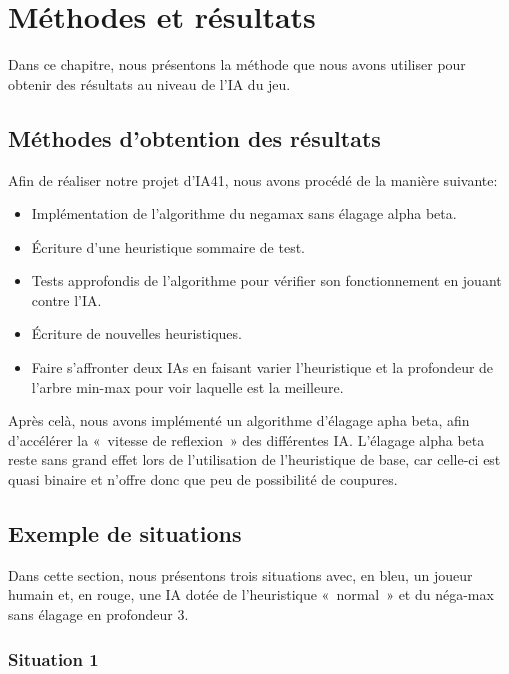 \chapter{Méthodes et résultats}\label{chapter:methodes-resultats}

Dans ce chapitre, nous présentons la méthode que nous avons utiliser pour obtenir des résultats au niveau de l'IA du jeu.

\section{Méthodes d'obtention des résultats}

Afin de réaliser notre projet d'IA41, nous avons procédé de la manière suivante:

\begin{itemize}
    \item Implémentation de l'algorithme du negamax sans élagage alpha beta.
    \item Écriture d'une heuristique sommaire de test.
    \item Tests approfondis de l'algorithme pour vérifier son fonctionnement en jouant contre l'IA\@.
    \item Écriture de nouvelles heuristiques.
    \item Faire s'affronter deux IAs en faisant varier l'heuristique et la profondeur de l'arbre min-max pour voir laquelle est
        la meilleure.
\end{itemize}

Après celà, nous avons implémenté un algorithme d'élagage apha beta, afin d'accélérer la « vitesse de reflexion » des différentes
IA\@. L'élagage alpha beta reste sans grand effet lors de l'utilisation de l'heuristique de base, car celle-ci est quasi binaire
et n'offre donc que peu de possibilité de coupures.

\section{Exemple de situations}

Dans cette section, nous présentons trois situations avec, en bleu, un joueur humain et, en rouge, une IA
dotée de l'heuristique « normal » et du néga-max sans élagage en profondeur 3.

\subsection{Situation 1}

